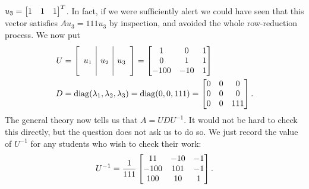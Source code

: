 \documentclass[a4paper]{amsart}
\renewenvironment{solution}{\SolutionInline}{\endSolutionInline}
\begin{document}
\begin{solution}
 $u_3=\left[\begin{matrix} 1&1&1\end{matrix}\right]^T$.  In fact, if we were sufficiently alert we
 could have seen that this vector satisfies $Au_3=111u_3$ by
 inspection, and avoided the whole row-reduction process.
 We now put 
 \begin{align*}
  U &=
   \left[\begin{array}{c|c|c} && \\ u_1 & u_2 & u_3 \\ && \end{array}\right]
   = \left[\begin{matrix} 1 & 0 & 1 \\ 0 & 1 & 1 \\ -100 & -10 & 1 \end{matrix}\right] \\
  D &= \operatorname{diag}(\lambda_1,\lambda_2,\lambda_3) = \operatorname{diag}(0,0,111) = 
       \left[\begin{matrix} 0&0&0 \\ 0&0&0 \\ 0&0&111 \end{matrix}\right].
 \end{align*}
 The general theory now tells us that $A=UDU^{-1}$.  It would not be
 hard to check this directly, but the question does not ask us to do
 so.  We just record the value of $U^{-1}$ for any students who wish
 to check their work:
 \[ U^{-1} = \frac{1}{111} \left[\begin{matrix}
      11&-10&-1\\
      -100&101&-1\\
      100&10&1\\
      \end{matrix}\right].
 \]
\end{solution}
\end{document}
